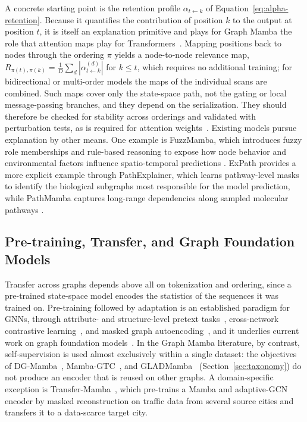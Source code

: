 \documentclass[acmsmall]{acmart}
\begin{document}
A concrete starting point is the retention profile
$\alpha_{t\leftarrow k}$ of Equation~\eqref{eq:alpha-retention}. Because it
quantifies the contribution of position $k$ to the output at position $t$, it
is itself an explanation primitive and plays for Graph Mamba the role that
attention maps play for Transformers~\cite{ali2025hidden}. Mapping positions
back to nodes through the ordering $\pi$ yields a node-to-node relevance map,
$R_{\pi(t),\pi(k)}=\frac{1}{D}\sum_{d}|\alpha^{(d)}_{t\leftarrow k}|$ for
$k\le t$, which requires no additional training; for bidirectional or
multi-order models the maps of the individual scans are combined. Such maps
cover only the state-space path, not the gating or local message-passing
branches, and they depend on the serialization. They should therefore be
checked for stability across orderings and validated with perturbation tests,
as is required for attention weights~\cite{jain2019attention}. Existing models pursue explanation by other means. One example is FuzzMamba, which introduces fuzzy role memberships
and rule-based reasoning to expose how node behavior and environmental factors
influence spatio-temporal predictions \cite{chen2026modeling}. ExPath provides a more explicit example through PathExplainer, which learns
pathway-level masks to identify the biological subgraphs most responsible for
the model prediction, while PathMamba captures long-range dependencies along
sampled molecular pathways \cite{kotoge2026expath}.

\subsection{Pre-training, Transfer, and Graph Foundation Models}
\label{sec:ch-pretraining}

Transfer across graphs depends above all on tokenization and ordering, since a pre-trained state-space model encodes the statistics of the sequences it was trained on.
Pre-training followed by adaptation is an established paradigm for GNNs,
through attribute- and structure-level pretext tasks~\cite{hu2019strategies},
cross-network contrastive learning~\cite{qiu2020gcc}, and masked graph
autoencoding~\cite{hou2022graphmae}, and it underlies current work on graph
foundation models~\cite{liu2025graph,mao2024position}. In the Graph Mamba
literature, by contrast, self-supervision is used almost exclusively within a
single dataset: the objectives of DG-Mamba~\cite{yuan2025dg},
Mamba-GTC~\cite{Meng2026Mamba-GTC}, and GLADMamba~\cite{fu2025gladmamba}
(Section~\ref{sec:taxonomy}) do not produce an encoder that is
reused on other graphs. A domain-specific exception is
Transfer-Mamba~\cite{cheng2025transfer}, which pre-trains a Mamba and
adaptive-GCN encoder by masked reconstruction on traffic data from several
source cities and transfers it to a data-scarce target city.
\end{document}
